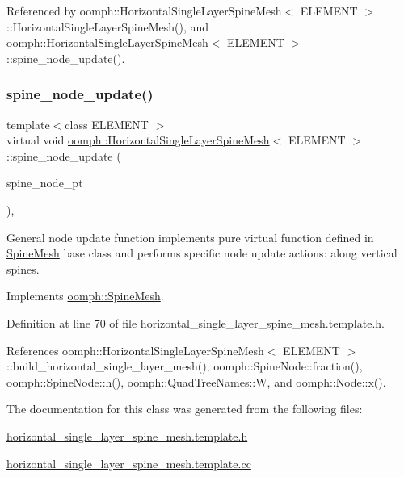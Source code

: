 Referenced by oomph\+::\+Horizontal\+Single\+Layer\+Spine\+Mesh$<$ E\+L\+E\+M\+E\+N\+T $>$\+::\+Horizontal\+Single\+Layer\+Spine\+Mesh(), and oomph\+::\+Horizontal\+Single\+Layer\+Spine\+Mesh$<$ E\+L\+E\+M\+E\+N\+T $>$\+::spine\+\_\+node\+\_\+update().

\mbox{\label{classoomph_1_1HorizontalSingleLayerSpineMesh_a4b9b833a281aa64a809b4e47159282e6}} 
\subsubsection{\texorpdfstring{spine\+\_\+node\+\_\+update()}{spine\_node\_update()}}
{\footnotesize\ttfamily template$<$class E\+L\+E\+M\+E\+NT $>$ \\
virtual void \hyperlink{classoomph_1_1HorizontalSingleLayerSpineMesh}{oomph\+::\+Horizontal\+Single\+Layer\+Spine\+Mesh}$<$ E\+L\+E\+M\+E\+NT $>$\+::spine\+\_\+node\+\_\+update (\begin{DoxyParamCaption}\item[{\hyperlink{classoomph_1_1SpineNode}{Spine\+Node} $\ast$}]{spine\+\_\+node\+\_\+pt }\end{DoxyParamCaption})\hspace{0.3cm}{\ttfamily [inline]}, {\ttfamily [virtual]}}



General node update function implements pure virtual function defined in \hyperlink{classoomph_1_1SpineMesh}{Spine\+Mesh} base class and performs specific node update actions\+: along vertical spines. 



Implements \hyperlink{classoomph_1_1SpineMesh_aa7843aadce3c540f34442671f59eb75b}{oomph\+::\+Spine\+Mesh}.



Definition at line 70 of file horizontal\+\_\+single\+\_\+layer\+\_\+spine\+\_\+mesh.\+template.\+h.



References oomph\+::\+Horizontal\+Single\+Layer\+Spine\+Mesh$<$ E\+L\+E\+M\+E\+N\+T $>$\+::build\+\_\+horizontal\+\_\+single\+\_\+layer\+\_\+mesh(), oomph\+::\+Spine\+Node\+::fraction(), oomph\+::\+Spine\+Node\+::h(), oomph\+::\+Quad\+Tree\+Names\+::W, and oomph\+::\+Node\+::x().



The documentation for this class was generated from the following files\+:\begin{DoxyCompactItemize}
\item 
\hyperlink{horizontal__single__layer__spine__mesh_8template_8h}{horizontal\+\_\+single\+\_\+layer\+\_\+spine\+\_\+mesh.\+template.\+h}\item 
\hyperlink{horizontal__single__layer__spine__mesh_8template_8cc}{horizontal\+\_\+single\+\_\+layer\+\_\+spine\+\_\+mesh.\+template.\+cc}\end{DoxyCompactItemize}
